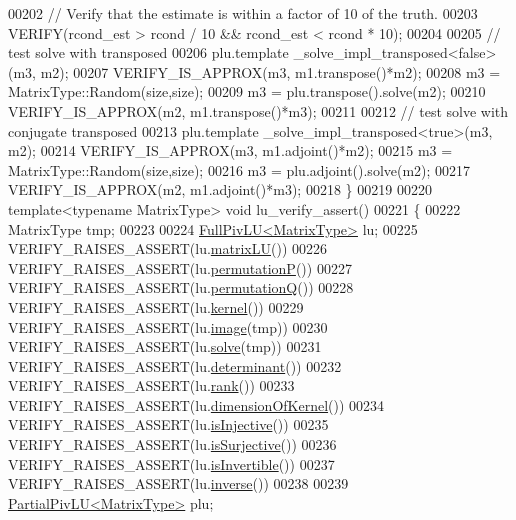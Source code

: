 \begin{DoxyCode}
00202   \textcolor{comment}{// Verify that the estimate is within a factor of 10 of the truth.}
00203   VERIFY(rcond\_est > rcond / 10 && rcond\_est < rcond * 10);
00204 
00205   \textcolor{comment}{// test solve with transposed}
00206   plu.template \_solve\_impl\_transposed<false>(m3, m2);
00207   VERIFY\_IS\_APPROX(m3, m1.transpose()*m2);
00208   m3 = MatrixType::Random(size,size);
00209   m3 = plu.transpose().solve(m2);
00210   VERIFY\_IS\_APPROX(m2, m1.transpose()*m3);
00211 
00212   \textcolor{comment}{// test solve with conjugate transposed}
00213   plu.template \_solve\_impl\_transposed<true>(m3, m2);
00214   VERIFY\_IS\_APPROX(m3, m1.adjoint()*m2);
00215   m3 = MatrixType::Random(size,size);
00216   m3 = plu.adjoint().solve(m2);
00217   VERIFY\_IS\_APPROX(m2, m1.adjoint()*m3);
00218 \}
00219 
00220 \textcolor{keyword}{template}<\textcolor{keyword}{typename} MatrixType> \textcolor{keywordtype}{void} lu\_verify\_assert()
00221 \{
00222   MatrixType tmp;
00223 
00224   \hyperlink{group___l_u___module_class_eigen_1_1_full_piv_l_u}{FullPivLU<MatrixType>} lu;
00225   VERIFY\_RAISES\_ASSERT(lu.\hyperlink{group___l_u___module_afea0b8fc707a9097d46fe358cb18bbff}{matrixLU}())
00226   VERIFY\_RAISES\_ASSERT(lu.\hyperlink{group___l_u___module_a09274c82240f6441af5e6c99e24e756d}{permutationP}())
00227   VERIFY\_RAISES\_ASSERT(lu.\hyperlink{group___l_u___module_a8d18190c7618de271cba7293f0493a36}{permutationQ}())
00228   VERIFY\_RAISES\_ASSERT(lu.\hyperlink{group___l_u___module_a70f52eeb2cd07dfbf790fce106fb4015}{kernel}())
00229   VERIFY\_RAISES\_ASSERT(lu.\hyperlink{group___l_u___module_a0893985d2dab367baa6e57c6fd0c4956}{image}(tmp))
00230   VERIFY\_RAISES\_ASSERT(lu.\hyperlink{group___l_u___module_af563471f6f3283fd10779ef02dd0b748}{solve}(tmp))
00231   VERIFY\_RAISES\_ASSERT(lu.\hyperlink{group___l_u___module_a71654e5c60a26407ecccfaa5b34bb0aa}{determinant}())
00232   VERIFY\_RAISES\_ASSERT(lu.\hyperlink{group___l_u___module_a67a870aa69e699e058d04802ba0bdad9}{rank}())
00233   VERIFY\_RAISES\_ASSERT(lu.\hyperlink{group___l_u___module_a64e191225834e91161ea53ad4b78167b}{dimensionOfKernel}())
00234   VERIFY\_RAISES\_ASSERT(lu.\hyperlink{group___l_u___module_ab13992c852aa593461d9b81790b56667}{isInjective}())
00235   VERIFY\_RAISES\_ASSERT(lu.\hyperlink{group___l_u___module_a1f6222875fc3a181ee1544b9b36dfda5}{isSurjective}())
00236   VERIFY\_RAISES\_ASSERT(lu.\hyperlink{group___l_u___module_afdf2579c93473650f2ef2a47a376c4a0}{isInvertible}())
00237   VERIFY\_RAISES\_ASSERT(lu.\hyperlink{group___l_u___module_ae6f4bb55f859f6353f99cf15ecff4b25}{inverse}())
00238 
00239   \hyperlink{group___l_u___module_class_eigen_1_1_partial_piv_l_u}{PartialPivLU<MatrixType>} plu;

\end{DoxyCode}
